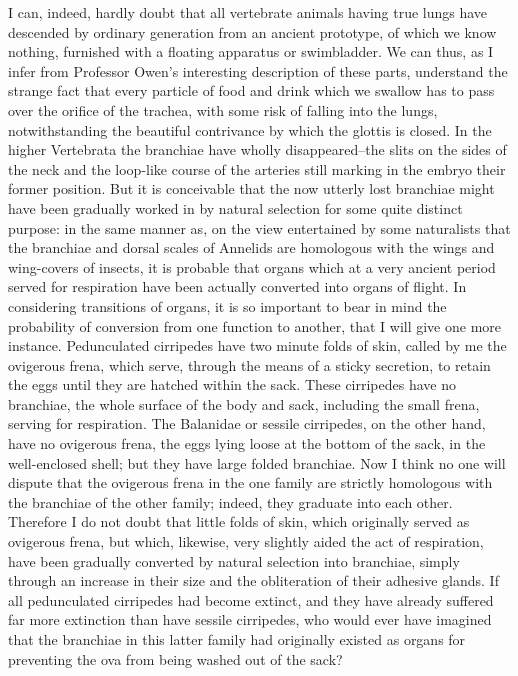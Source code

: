 I can, indeed, hardly doubt that all vertebrate animals having true lungs have descended by ordinary generation from an ancient prototype, of which we know nothing, furnished with a floating apparatus or swimbladder. We can thus, as I infer from Professor Owen's interesting description of these parts, understand the strange fact that every particle of food and drink which we swallow has to pass over the orifice of the trachea, with some risk of falling into the lungs, notwithstanding the beautiful contrivance by which the glottis is closed. In the higher Vertebrata the branchiae have wholly disappeared--the slits on the sides of the neck and the loop-like course of the arteries still marking in the embryo their former position. But it is conceivable that the now utterly lost branchiae might have been gradually worked in by natural selection for some quite distinct purpose: in the same manner as, on the view entertained by some naturalists that the branchiae and dorsal scales of Annelids are homologous with the wings and wing-covers of insects, it is probable that organs which at a very ancient period served for respiration have been actually converted into organs of flight.
In considering transitions of organs, it is so important to bear in mind the probability of conversion from one function to another, that I will give one more instance. Pedunculated cirripedes have two minute folds of skin, called by me the ovigerous frena, which serve, through the means of a sticky secretion, to retain the eggs until they are hatched within the sack. These cirripedes have no branchiae, the whole surface of the body and sack, including the small frena, serving for respiration. The Balanidae or sessile cirripedes, on the other hand, have no ovigerous frena, the eggs lying loose at the bottom of the sack, in the well-enclosed shell; but they have large folded branchiae. Now I think no one will dispute that the ovigerous frena in the one family are strictly homologous with the branchiae of the other family; indeed, they graduate into each other. Therefore I do not doubt that little folds of skin, which originally served as ovigerous frena, but which, likewise, very slightly aided the act of respiration, have been gradually converted by natural selection into branchiae, simply through an increase in their size and the obliteration of their adhesive glands. If all pedunculated cirripedes had become extinct, and they have already suffered far more extinction than have sessile cirripedes, who would ever have imagined that the branchiae in this latter family had originally existed as organs for preventing the ova from being washed out of the sack?
